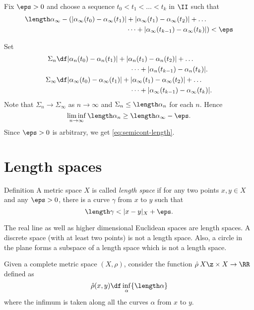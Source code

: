 Fix $\eps > 0$ and choose a sequence $t_0<t_1<\dots<t_k$ in $\II$
such that 
\begin{align*}
\length\alpha_\infty-
(|\alpha_\infty(t_0)-\alpha_\infty(t_1)|&+|\alpha_\infty(t_1)-\alpha_\infty(t_2)|+\dots
\\
&\dots+|\alpha_\infty(t_{k-1})-\alpha_\infty(t_k)|)<\eps
\end{align*}


Set 
\begin{align*}\Sigma_n
&\df
|\alpha_n(t_0)-\alpha_n(t_1)|+|\alpha_n(t_1)-\alpha_n(t_2)|+\dots
\\
&\ \ \ \ \ \ \ \ \ \ \ \ \ \ \ \ \ \ \ \ \ \ \ \ \ \ \ \ \ \ \ \ \dots+|\alpha_n(t_{k-1})-\alpha_n(t_k)|.
\\
\Sigma_\infty
&\df
|\alpha_\infty(t_0)-\alpha_\infty(t_1)|+|\alpha_\infty(t_1)-\alpha_\infty(t_2)|+\dots
\\
&\ \ \ \ \ \ \ \ \ \ \ \ \ \ \ \ \ \ \ \ \ \ \ \ \ \ \ \ \ \ \ \ \dots+|\alpha_\infty(t_{k-1})-\alpha_\infty(t_k)|.
\end{align*}
Note that $\Sigma_n\to \Sigma_\infty$ as $n\to\infty$
and $\Sigma_n\le\length\alpha_n$ for each $n$.
Hence
$$\liminf_{n\to\infty} \length\alpha_n \ge \length\alpha_\infty-\eps.$$
Since $\eps>0$ is arbitrary, we get \ref{eq:semicont-length}.\qeds

\section*{Length spaces}%

\begin{thm}{Definition}
A metric space $X$ is called \emph{length space} if for any two points $x,y\in X$ and any $\eps>0$, there is a curve $\gamma$ from $x$ to $y$ such that
$$\length \gamma<|x-y|_X+\eps.$$

\end{thm}

 The real line as well as higher dimensional Euclidean spaces are length spaces.
A discrete space (with at least two points) is not a length space.
Also, a circle in the plane forms a subspace of a length space which is not a length space.


Given a complete metric space $(X,\rho)$, 
consider the function $\hat \rho\:X\z\times X\to\RR$ defined as
$$\hat \rho(x,y)\df\inf_\alpha\{\length\alpha\}$$
where the infimum is taken along all the curves $\alpha$ from $x$ to $y$.

